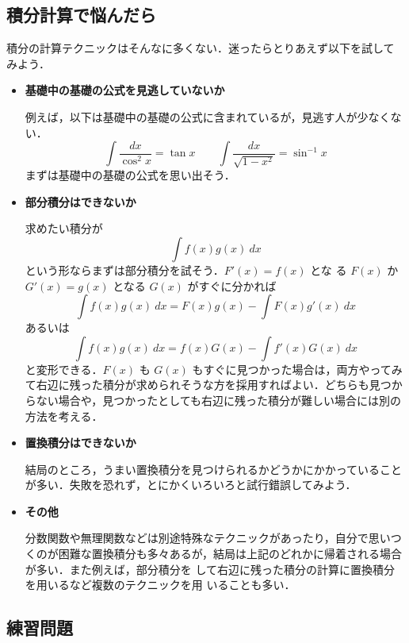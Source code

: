 \documentclass[10pt, uplatex, dvipdfmx]{jsarticle}
\theoremstyle{definition}
\numberwithin{equation}{section}
\begin{document}
\newpage

\subsection{積分計算で悩んだら}

積分の計算テクニックはそんなに多くない．迷ったらとりあえず以下を試して
みよう．


\begin{itemize}
  \setlength{\itemsep}{2zh}

\item \textbf{基礎中の基礎の公式を見逃していないか}

例えば，以下は基礎中の基礎の公式に含まれているが，見逃す人が少なくない．
\[
\int \frac{dx}{\cos^2 x} = \tan x \qquad 
\int \frac{dx}{\sqrt{1-x^2}}= \sin^{-1} x 
\]
まずは基礎中の基礎の公式を思い出そう．


\item \textbf{部分積分はできないか}

  求めたい積分が
  \[
    \int f(x) g(x) \ dx
  \]
  という形ならまずは部分積分を試そう．$F'(x)=f(x)$ とな
  る $F(x)$ か $G'(x) = g(x)$ となる $G(x)$ がすぐに分かれば
  \[
    \int f(x) g(x) \ dx = F(x) g(x) - \int F(x) g'(x) \ dx
  \]
  あるいは
  \[
    \int f(x) g(x) \ dx = f(x) G(x) - \int f'(x) G(x) \ dx
  \]
  と変形できる．$F(x)$ も $G(x)$ もすぐに見つかった場合は，両方やってみ
  て右辺に残った積分が求められそうな方を採用すればよい．どちらも見つか
  らない場合や，見つかったとしても右辺に残った積分が難しい場合には別の
  方法を考える．

\item \textbf{置換積分はできないか}

  結局のところ，うまい置換積分を見つけられるかどうかにかかっていること
  が多い．失敗を恐れず，とにかくいろいろと試行錯誤してみよう．

\item \textbf{その他}

  分数関数や無理関数などは別途特殊なテクニックがあったり，自分で思いつ
  くのが困難な置換積分も多々あるが，結局は上記のどれかに帰着される場合
  が多い．また例えば，部分積分を
  して右辺に残った積分の計算に置換積分を用いるなど複数のテクニックを用
  いることも多い．

\end{itemize}

\newpage

\subsection{練習問題}
\end{document}
